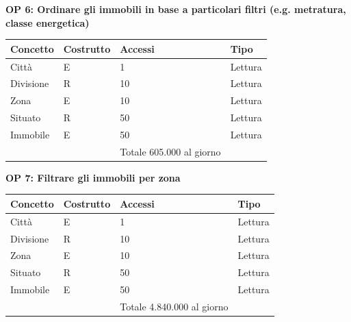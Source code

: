 \documentclass[a4paper,12pt]{report}
\begin{document}
            \textbf{OP 6: Ordinare gli immobili in base a particolari filtri (e.g. metratura, classe energetica)}
        	\begin{table}[H]
            \centering
             \begin{tabular}{||l l l l||}
             \hline
             Concetto & Costrutto & Accessi & Tipo \\ [0.5ex] 
             \hline\hline
             Città & E & 1 & Lettura \\ 
             Divisione & R & 10 & Lettura \\ 
             Zona & E & 10 & Lettura \\ 
             Situato & R & 50 & Lettura \\ 
             Immobile & E & 50 & Lettura \\
             \hline
                &   & Totale  605.000 al giorno &  \\ [1ex] 
             \hline
             \end{tabular}
            \end{table}

            \textbf{OP 7: Filtrare gli immobili per zona}
        	\begin{table}[H]
            \centering
             \begin{tabular}{||l l l l||}
             \hline
             Concetto & Costrutto & Accessi & Tipo \\ [0.5ex] 
             \hline\hline
             Città & E & 1 & Lettura \\ 
             Divisione & R & 10 & Lettura \\ 
             Zona & E & 10 & Lettura \\ 
             Situato & R & 50 & Lettura \\ 
             Immobile & E & 50 & Lettura \\
             \hline
                &   & Totale  4.840.000 al giorno &  \\ [1ex] 
             \hline
             \end{tabular}
            \end{table}
\end{document}
